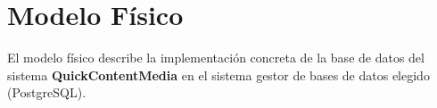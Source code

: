 \section{Modelo Físico}
El modelo físico describe la implementación concreta de la base de datos del sistema \textbf{QuickContentMedia} en el sistema gestor de bases de datos elegido (PostgreSQL). 



\newpage


\newpage




